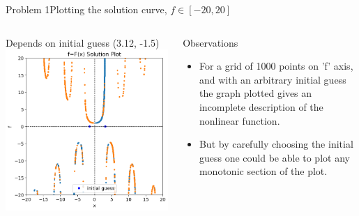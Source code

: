 \documentclass{beamer}
\begin{document}
\begin{frame}{Problem 1}{Plotting the solution curve, $f\in[-20,20]$}
    \vspace{-2.5em}
    \begin{columns}
        \begin{block}{\footnotesize Depends on initial guess (3.12, -1.5)}
            \includegraphics[width=\textwidth]{Figures/prob1_pltsol1.png}
        \end{block}
        \begin{block}{\footnotesize Observations }
            \footnotesize
            \begin{itemize}
                \item For a grid of 1000 points on 'f' axis, and with an arbitrary initial guess the graph plotted gives an incomplete description of the nonlinear function.
                \item But by carefully choosing the initial guess one could be able to plot any monotonic section of the plot.
            \end{itemize}
        \end{block}
    \end{columns}
\end{frame}
\end{document}
